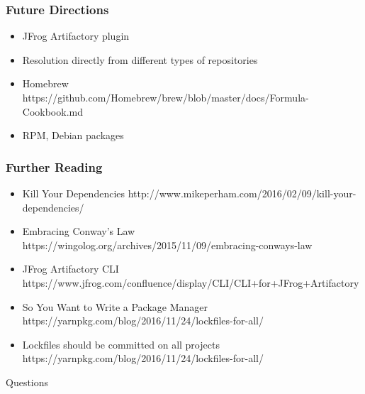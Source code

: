 \documentclass{beamer}
\begin{document}
\begin{frame}
  \frametitle{Future Directions}
  \begin{itemize}
  \item JFrog Artifactory plugin
  \item Resolution directly from different types of repositories
  \item Homebrew \\
    {\small https://github.com/Homebrew/brew/blob/master/docs/Formula-Cookbook.md}
  \item RPM, Debian packages
  \end{itemize}
\end{frame}
\begin{frame}
  \frametitle{Further Reading}
  \begin{itemize}
  \item Kill Your Dependencies {\small http://www.mikeperham.com/2016/02/09/kill-your-dependencies/}
  \item Embracing Conway's Law {\small https://wingolog.org/archives/2015/11/09/embracing-conways-law}
  \item JFrog Artifactory CLI {\small https://www.jfrog.com/confluence/display/CLI/CLI+for+JFrog+Artifactory}
  \item So You Want to Write a Package Manager {\small https://yarnpkg.com/blog/2016/11/24/lockfiles-for-all/}
  \item Lockfiles should be committed on all projects {\small https://yarnpkg.com/blog/2016/11/24/lockfiles-for-all/}
  \end{itemize}
\end{frame}
\begin{frame}
  \centerline{\color{blue}\Large Questions}
\end{frame}
\end{document}

